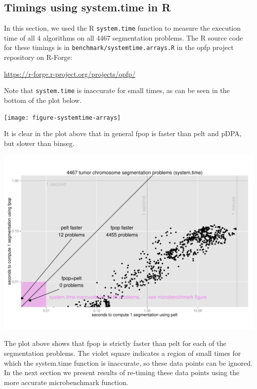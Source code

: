 \documentclass{article}
\begin{document}
\subsection{Timings using system.time in R}

In this section, we used the R \verb|system.time| function to measure
the execution time of all 4 algorithms on all 4467 segmentation
problems. The R source code for these timings is in
\verb|benchmark/systemtime.arrays.R| in the opfp project repository on
R-Forge:

\url{https://r-forge.r-project.org/projects/opfp/}

Note that \verb|system.time| is inaccurate for small times, as can be
seen in the bottom of the plot below.

\begin{center}
  \texttt{[image: figure-systemtime-arrays]}
\end{center}

It is clear in the plot above that in general fpop is faster than pelt
and pDPA, but slower than binseg.

\begin{center}
  \includegraphics[width=\textwidth]{figure-systemtime-arrays-fpop-pelt}
\end{center}

The plot above shows that fpop is strictly faster than pelt for each
of the segmentation problems. The violet square indicates a region of
small times for which the system.time function is inaccurate, so these
data points can be ignored. In the next section we present results of
re-timing these data points using the more accurate microbenchmark
function.
\end{document}
